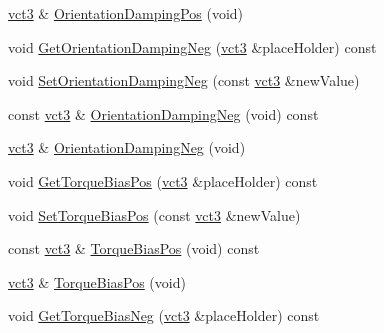 \begin{DoxyCompactItemize}
\item 
\hyperlink{vct_fixed_size_vector_types_8h_a3af82acdbf4eeb73c551909240b106ea}{vct3} \& \hyperlink{classprm_fixture_gain_cartesian_set_a0548f62e945bf28d64969320071e8fc4}{Orientation\-Damping\-Pos} (void)
\item 
void \hyperlink{classprm_fixture_gain_cartesian_set_a66fd3c84d0e6e0f506132cb11b4956fc}{Get\-Orientation\-Damping\-Neg} (\hyperlink{vct_fixed_size_vector_types_8h_a3af82acdbf4eeb73c551909240b106ea}{vct3} \&place\-Holder) const 
\item 
void \hyperlink{classprm_fixture_gain_cartesian_set_a60cd207226e60d8e96279ccc41717a0d}{Set\-Orientation\-Damping\-Neg} (const \hyperlink{vct_fixed_size_vector_types_8h_a3af82acdbf4eeb73c551909240b106ea}{vct3} \&new\-Value)
\item 
const \hyperlink{vct_fixed_size_vector_types_8h_a3af82acdbf4eeb73c551909240b106ea}{vct3} \& \hyperlink{classprm_fixture_gain_cartesian_set_a8044209170f9f4b4319de0eeeb5744f8}{Orientation\-Damping\-Neg} (void) const 
\item 
\hyperlink{vct_fixed_size_vector_types_8h_a3af82acdbf4eeb73c551909240b106ea}{vct3} \& \hyperlink{classprm_fixture_gain_cartesian_set_ade1010069dbeecab51e7a67a5aa3643e}{Orientation\-Damping\-Neg} (void)
\item 
void \hyperlink{classprm_fixture_gain_cartesian_set_ac9b48e4fc6c6e7d2120cd8503b5046c3}{Get\-Torque\-Bias\-Pos} (\hyperlink{vct_fixed_size_vector_types_8h_a3af82acdbf4eeb73c551909240b106ea}{vct3} \&place\-Holder) const 
\item 
void \hyperlink{classprm_fixture_gain_cartesian_set_a69ddbc2a1ab28c10f6efba56401fb677}{Set\-Torque\-Bias\-Pos} (const \hyperlink{vct_fixed_size_vector_types_8h_a3af82acdbf4eeb73c551909240b106ea}{vct3} \&new\-Value)
\item 
const \hyperlink{vct_fixed_size_vector_types_8h_a3af82acdbf4eeb73c551909240b106ea}{vct3} \& \hyperlink{classprm_fixture_gain_cartesian_set_ad9941ff289b7b136c5ee621ecd0d7b52}{Torque\-Bias\-Pos} (void) const 
\item 
\hyperlink{vct_fixed_size_vector_types_8h_a3af82acdbf4eeb73c551909240b106ea}{vct3} \& \hyperlink{classprm_fixture_gain_cartesian_set_aac09bddd515e8ff1eec93e86bed83a7d}{Torque\-Bias\-Pos} (void)
\item 
void \hyperlink{classprm_fixture_gain_cartesian_set_aacf822df14bef782f995ab98ca73569a}{Get\-Torque\-Bias\-Neg} (\hyperlink{vct_fixed_size_vector_types_8h_a3af82acdbf4eeb73c551909240b106ea}{vct3} \&place\-Holder) const 
\item 

\end{DoxyCompactItemize}
